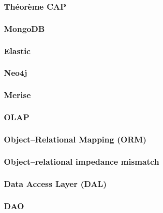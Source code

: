 \begin{frame}
    \frametitle{Théorème CAP}
\end{frame}

\begin{frame}
    \frametitle{MongoDB}
\end{frame}

\begin{frame}
    \frametitle{Elastic}
\end{frame}

\begin{frame}
    \frametitle{Neo4j}
\end{frame}

\begin{frame}
    \frametitle{Merise}
\end{frame}

\begin{frame}
    \frametitle{OLAP}
\end{frame}

\begin{frame}
    \frametitle{Object–Relational Mapping (ORM)}
\end{frame}

\begin{frame}
    \frametitle{Object–relational impedance mismatch}
\end{frame}

\begin{frame}
    \frametitle{Data Access Layer (DAL)}
\end{frame}

\begin{frame}
    \frametitle{DAO}
\end{frame}

